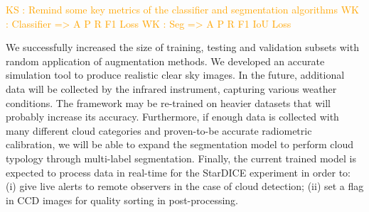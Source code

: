 \documentclass[amt, article]{copernicus}
\begin{document}
\textcolor{orange}{KS : Remind some key metrics of the classifier and segmentation algorithms}
\textcolor{orange}{WK : Classifier => A P R F1 Loss}
\textcolor{orange}{WK : Seg => A P R F1 IoU Loss}

We successfully increased the size of training, testing and validation subsets with random application of augmentation methods. We developed an accurate simulation tool to produce realistic clear sky images. In the future, additional data will be collected by the infrared instrument, capturing various weather conditions. The framework may be re-trained on heavier datasets that will probably increase its accuracy.  Furthermore, if enough data is collected with many different cloud categories and proven-to-be accurate radiometric calibration, we will be able to expand the segmentation model to perform cloud typology through multi-label segmentation. Finally, the current trained model is expected to process data in real-time for the StarDICE experiment in order to: (i) give live alerts to remote observers in the case of cloud detection; (ii) set a flag in CCD images for quality sorting in post-processing.









\end{document}
